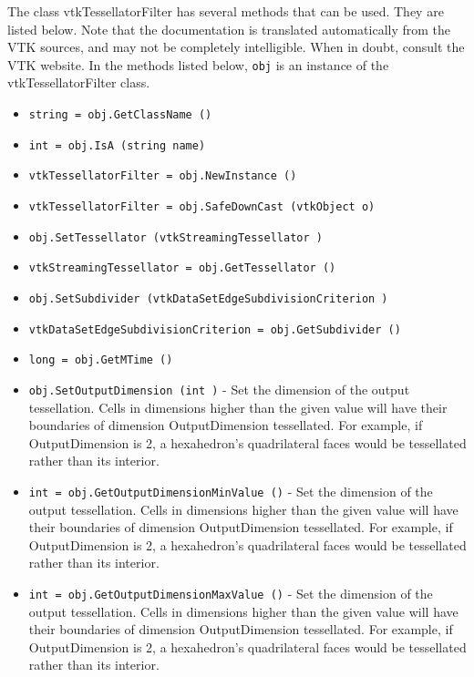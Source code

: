 The class vtkTessellatorFilter has several methods that can be used.
  They are listed below.
Note that the documentation is translated automatically from the VTK sources,
and may not be completely intelligible.  When in doubt, consult the VTK website.
In the methods listed below, \verb|obj| is an instance of the vtkTessellatorFilter class.
\begin{itemize}
\item  \verb|string = obj.GetClassName ()|

\item  \verb|int = obj.IsA (string name)|

\item  \verb|vtkTessellatorFilter = obj.NewInstance ()|

\item  \verb|vtkTessellatorFilter = obj.SafeDownCast (vtkObject o)|

\item  \verb|obj.SetTessellator (vtkStreamingTessellator )|

\item  \verb|vtkStreamingTessellator = obj.GetTessellator ()|

\item  \verb|obj.SetSubdivider (vtkDataSetEdgeSubdivisionCriterion )|

\item  \verb|vtkDataSetEdgeSubdivisionCriterion = obj.GetSubdivider ()|

\item  \verb|long = obj.GetMTime ()|

\item  \verb|obj.SetOutputDimension (int )| -  Set the dimension of the output tessellation.
 Cells in dimensions higher than the given value will have
 their boundaries of dimension  OutputDimension tessellated.
 For example, if  OutputDimension is 2, a hexahedron's
 quadrilateral faces would be tessellated rather than its
 interior.

\item  \verb|int = obj.GetOutputDimensionMinValue ()| -  Set the dimension of the output tessellation.
 Cells in dimensions higher than the given value will have
 their boundaries of dimension  OutputDimension tessellated.
 For example, if  OutputDimension is 2, a hexahedron's
 quadrilateral faces would be tessellated rather than its
 interior.

\item  \verb|int = obj.GetOutputDimensionMaxValue ()| -  Set the dimension of the output tessellation.
 Cells in dimensions higher than the given value will have
 their boundaries of dimension  OutputDimension tessellated.
 For example, if  OutputDimension is 2, a hexahedron's
 quadrilateral faces would be tessellated rather than its
 interior.


\end{itemize}
